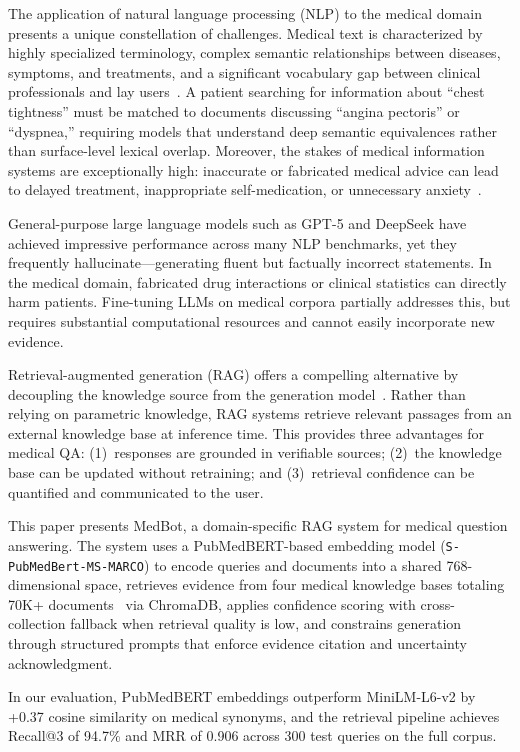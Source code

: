 \documentclass[11pt,a4paper]{article}
\begin{document}
The application of natural language processing (NLP) to the medical domain presents a unique constellation of challenges. Medical text is characterized by highly specialized terminology, complex semantic relationships between diseases, symptoms, and treatments, and a significant vocabulary gap between clinical professionals and lay users~\citep{gu2021domain}. A patient searching for information about ``chest tightness'' must be matched to documents discussing ``angina pectoris'' or ``dyspnea,'' requiring models that understand deep semantic equivalences rather than surface-level lexical overlap. Moreover, the stakes of medical information systems are exceptionally high: inaccurate or fabricated medical advice can lead to delayed treatment, inappropriate self-medication, or unnecessary anxiety~\citep{jin2021disease}.

General-purpose large language models such as GPT-5 and DeepSeek have achieved impressive performance across many NLP benchmarks, yet they frequently hallucinate---generating fluent but factually incorrect statements. In the medical domain, fabricated drug interactions or clinical statistics can directly harm patients. Fine-tuning LLMs on medical corpora partially addresses this, but requires substantial computational resources and cannot easily incorporate new evidence.

Retrieval-augmented generation (RAG) offers a compelling alternative by decoupling the knowledge source from the generation model~\citep{lewis2020retrieval}. Rather than relying on parametric knowledge, RAG systems retrieve relevant passages from an external knowledge base at inference time. This provides three advantages for medical QA: (1)~responses are grounded in verifiable sources; (2)~the knowledge base can be updated without retraining; and (3)~retrieval confidence can be quantified and communicated to the user.

This paper presents MedBot, a domain-specific RAG system for medical question answering. The system uses a PubMedBERT-based embedding model (\texttt{S-PubMedBert-MS-MARCO}) to encode queries and documents into a shared 768-dimensional space, retrieves evidence from four medical knowledge bases totaling 70K+ documents~\citep{abacha2019question,jin2019pubmedqa,jin2021disease} via ChromaDB, applies confidence scoring with cross-collection fallback when retrieval quality is low, and constrains generation through structured prompts that enforce evidence citation and uncertainty acknowledgment.

In our evaluation, PubMedBERT embeddings outperform MiniLM-L6-v2 by +0.37 cosine similarity on medical synonyms, and the retrieval pipeline achieves Recall@3 of 94.7\% and MRR of 0.906 across 300 test queries on the full corpus.
\end{document}
